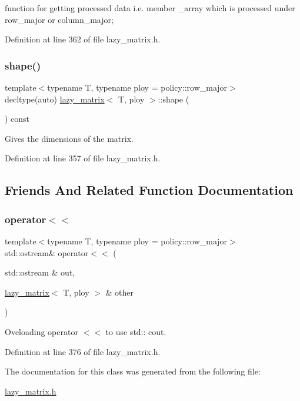 function for getting processed data i.\+e. member \+\_\+array which is processed under row\+\_\+major or column\+\_\+major; 



Definition at line 362 of file lazy\+\_\+matrix.\+h.

\mbox{\label{classlazy__matrix_a4bcc0da3ca5bf4e297c91d48e5005369}} 
\subsubsection{\texorpdfstring{shape()}{shape()}}
{\footnotesize\ttfamily template$<$typename T, typename ploy = policy\+::row\+\_\+major$>$ \\
decltype(auto) \mbox{\hyperlink{classlazy__matrix}{lazy\+\_\+matrix}}$<$ T, ploy $>$\+::shape (\begin{DoxyParamCaption}{ }\end{DoxyParamCaption}) const\hspace{0.3cm}{\ttfamily [inline]}}



Gives the dimensions of the matrix. 



Definition at line 357 of file lazy\+\_\+matrix.\+h.



\subsection{Friends And Related Function Documentation}
\mbox{\label{classlazy__matrix_a88346f662d7a65addb3240c62dcdd1f9}} 
\subsubsection{\texorpdfstring{operator$<$$<$}{operator<<}}
{\footnotesize\ttfamily template$<$typename T, typename ploy = policy\+::row\+\_\+major$>$ \\
std\+::ostream\& operator$<$$<$ (\begin{DoxyParamCaption}\item[{std\+::ostream \&}]{out,  }\item[{\mbox{\hyperlink{classlazy__matrix}{lazy\+\_\+matrix}}$<$ T, ploy $>$ \&}]{other }\end{DoxyParamCaption})\hspace{0.3cm}{\ttfamily [friend]}}



Oveloading operator $<$$<$ to use std\+:\+: cout. 



Definition at line 376 of file lazy\+\_\+matrix.\+h.



The documentation for this class was generated from the following file\+:\begin{DoxyCompactItemize}
\item 
\mbox{\hyperlink{lazy__matrix_8h}{lazy\+\_\+matrix.\+h}}\end{DoxyCompactItemize}
